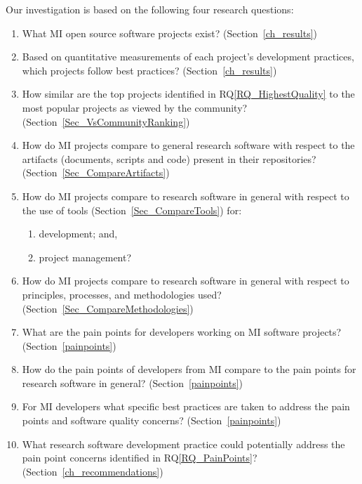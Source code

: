 \documentclass[final, 12pt, 3p, times]{elsarticle}
\newcounter{rqnum} %
\newcommand{\rqref}[1]{RQ\ref{#1}}
\newcounter{qnum} %
\begin{document}
Our investigation is based on the following four research questions:
\begin{enumerate}
\item[RQ\refstepcounter{rqnum}\therqnum \label{RQ_WhatProjects}:] What MI
{open source} software projects exist? (Section~\ref{ch_results})
\item [RQ\refstepcounter{rqnum}\therqnum \label{RQ_HighestQuality}:] Based on
quantitative measurements of each project's development practices, which
projects follow best practices? (Section~\ref{ch_results})
\item [RQ\refstepcounter{rqnum}\therqnum \label{RQ_CompareHQ2Popular}:] How
similar are the top projects identified in \rqref{RQ_HighestQuality}
to the most popular projects as viewed by the community?
(Section~\ref{Sec_VsCommunityRanking})
\item [RQ\refstepcounter{rqnum}\therqnum \label{RQ_CompareArtifacts}:] How
do MI projects compare to general research software with respect to the
artifacts (documents, scripts and code) present in their repositories?
(Section~\ref{Sec_CompareArtifacts})
\item [RQ\refstepcounter{rqnum}\therqnum \label{RQ_CompareToolsProjMngmnt}:]
How do MI projects compare to research software in general with respect to
the use of tools (Section~\ref{Sec_CompareTools}) for:
\begin{enumerate} 
	\item [\rqref{RQ_CompareToolsProjMngmnt}.a] development; and,
	\item [\rqref{RQ_CompareToolsProjMngmnt}.b] project management?
\end{enumerate}
\item [RQ\refstepcounter{rqnum}\therqnum \label{RQ_CompareMethodologies}:]
How do MI projects compare to research software in general with respect to
principles, processes, and methodologies used?
(Section~\ref{Sec_CompareMethodologies})
\item [RQ\refstepcounter{rqnum}\therqnum \label{RQ_PainPoints}:] What are
the pain points for developers working on MI software projects?
(Section~\ref{painpoints})
\item [RQ\refstepcounter{rqnum}\therqnum \label{RQ_ComparePainPoints}:] How
do the pain points of developers from MI compare to the pain points
for research software in general? (Section~\ref{painpoints})
\item [RQ\refstepcounter{rqnum}\therqnum \label{RQ_Concerns}:] For MI
developers what specific best practices are taken to address the pain points
and software quality concerns? (Section~\ref{painpoints})
\item [RQ\refstepcounter{rqnum}\therqnum \label{RQ_Recommend}:]
What research software development practice could potentially address the
pain point concerns identified in \rqref{RQ_PainPoints}?
(Section~\ref{ch_recommendations})
\end{enumerate}
\end{document}
